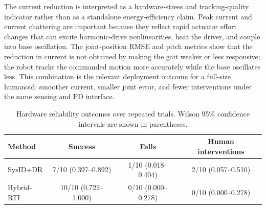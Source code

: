 \documentclass[twoside,final,1p,times]{elsarticle}
\newcommand{\rev}[1]{#1}
\newenvironment{revblock}{}{}
\begin{document}
\begin{revblock}
The current reduction is interpreted as a hardware-stress and tracking-quality indicator rather than as a standalone energy-efficiency claim. Peak current and current chattering are important because they reflect rapid actuator effort changes that can excite harmonic-drive nonlinearities, heat the driver, and couple into base oscillation. The joint-position RMSE and pitch metrics show that the reduction in current is not obtained by making the gait weaker or less responsive; the robot tracks the commanded motion more accurately while the base oscillates less. This combination is the relevant deployment outcome for a full-size humanoid: smoother current, smaller joint error, and fewer interventions under the same sensing and PD interface.
\end{revblock}


\begin{table}[t]
\begin{revblock}
\centering
\caption{\rev{Repeated hardware statistics at 0.5 m/s. Values are computed over 10 independent 30 s trials per method using the 10--30 s analysis window. CI denotes the half-width of the 95\% confidence interval.}}
\label{tab:hardware_stats}
\scriptsize
{}
\end{revblock}
\end{table}

\begin{table}[t]
\centering
\caption{\rev{Hardware reliability outcomes over repeated trials. Wilson 95\% confidence intervals are shown in parentheses.}}
\label{tab:hardware_success}
\small

\begin{revblock}
\begin{tabular}{lccc}
\toprule
Method & Success & Falls & Human interventions \\
\midrule
SysID+DR & 7/10 (0.397--0.892) & 1/10 (0.018--0.404) & 2/10 (0.057--0.510) \\
Hybrid-RTI & 10/10 (0.722--1.000) & 0/10 (0.000--0.278) & 0/10 (0.000--0.278) \\
\bottomrule
\end{tabular}
\end{revblock}
\end{table}
\end{document}
